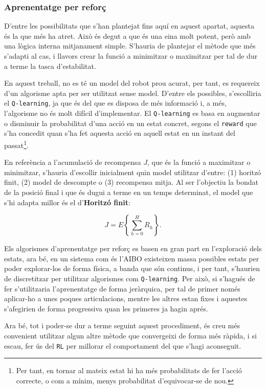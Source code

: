 \documentclass[12pt,a4paper,final,twoside]{article}
\begin{document}
\subsubsection{Aprenentatge per reforç}

D'entre les possibilitats que s'han plantejat fins aquí en aquest apartat, aquesta és la que més ha atret. Això és degut a que és una eina molt potent, però amb una lògica interna mitjanament simple. S'hauria de plantejar el mètode que més s'adapti al cas, i llavors crear la funció a minimitzar o maximitzar per tal de dur a terme la tasca d'estabilitat.

En aquest treball, no es té un model del robot prou acurat, per tant, es requereix d'un algorisme apta per ser utilitzat sense model. D'entre els possibles, s'escolliria el \texttt{Q-learning}, ja que és del que es disposa de més informació i, a més, l'algorisme no és molt difícil d'implementar. El \texttt{Q-learning} es basa en augmentar o disminuir la probabilitat d'una acció en un estat concret, segons el \texttt{reward} que s'ha concedit quan s'ha fet aquesta acció en aquell estat en un instant del passat\footnote{Per tant, en tornar al mateix estat hi ha més probabilitats de fer l'acció correcte, o com a mínim, menys probabilitat d'equivocar-se de nou.}.

En referència a l'acumulació de recompensa $J$, que és la funció a maximitzar o minimitzar, s'hauria d'escollir inicialment quin model utilitzar d'entre: (1) horitzó finit, (2) model de descompte o (3) recompensa mitja. Al ser l'objectiu la bondat de la posició final i que és dugui a terme en un temps determinat, el model que s'hi adapta millor és el d'\textbf{Horitzó finit}:

\begin{equation}
J=E\left\{ \sum_{h=0}^{H} R_{h} \right\}.
\end{equation}

Els algorismes d'aprenentatge per reforç es basen en gran part en l'exploració dels estats, ara bé, en un sistema com és l'AIBO existeixen massa possibles estats per poder explorar-los de forma física, a banda que són continus, i per tant, s'haurien de discretitzar per utilitzar algorismes com \texttt{Q-learning}. Per això, si s'hagués de fer s'utilitzaria l'aprenentatge de forma jeràrquica, per tal de primer només aplicar-ho a unes poques articulacions, mentre les altres estan fixes i aquestes s'afegirien de forma progressiva quan les primeres ja hagin aprés. 

Ara bé, tot i poder-se dur a terme seguint aquest procediment, és creu més convenient utilitzar algun altre mètode que convergeixi de forma més ràpida, i si escau, fer ús del \texttt{RL} per millorar el comportament del que s'hagi aconseguit.
\end{document}
